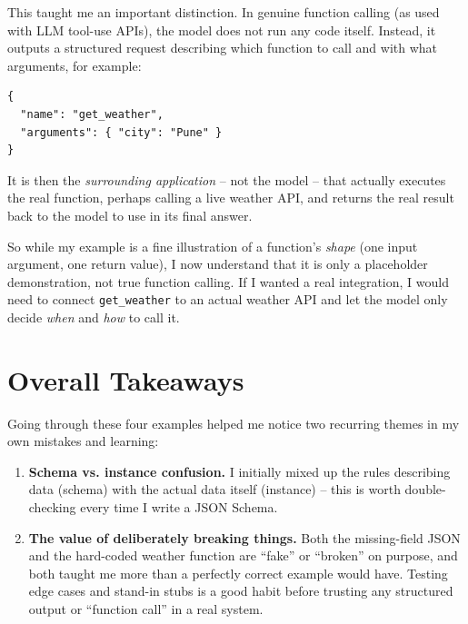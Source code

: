 \documentclass[11pt]{article}
\begin{document}
This taught me an important distinction. In genuine function calling (as used with LLM tool-use APIs), the model does not run any code itself. Instead, it outputs a structured request describing which function to call and with what arguments, for example:
\begin{lstlisting}
{
  "name": "get_weather",
  "arguments": { "city": "Pune" }
}
\end{lstlisting}
It is then the \emph{surrounding application} -- not the model -- that actually executes the real function, perhaps calling a live weather API, and returns the real result back to the model to use in its final answer.

So while my example is a fine illustration of a function's \emph{shape} (one input argument, one return value), I now understand that it is only a placeholder demonstration, not true function calling. If I wanted a real integration, I would need to connect \texttt{get\_weather} to an actual weather API and let the model only decide \emph{when} and \emph{how} to call it.

\section{Overall Takeaways}
Going through these four examples helped me notice two recurring themes in my own mistakes and learning:
\begin{enumerate}
  \item \textbf{Schema vs. instance confusion.} I initially mixed up the rules describing data (schema) with the actual data itself (instance) -- this is worth double-checking every time I write a JSON Schema.
  \item \textbf{The value of deliberately breaking things.} Both the missing-field JSON and the hard-coded weather function are ``fake'' or ``broken'' on purpose, and both taught me more than a perfectly correct example would have. Testing edge cases and stand-in stubs is a good habit before trusting any structured output or ``function call'' in a real system.
\end{enumerate}
\end{document}
